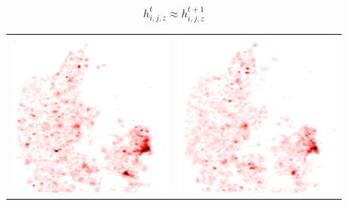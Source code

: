 \documentclass[11pt, oneside]{report}
\begin{document}
\[
h_{i,j,z}^t \approx h_{i,j,z}^{t+1}
\]

\begin{figure}
\centering
\begin{tabular}{cc}
\includegraphics[scale=0.5]{figs-tileheat/heatmap-e_1.png} & \includegraphics[scale=0.5]{figs-tileheat/heatmap-e_2.png} \\

\end{tabular}
\end{figure}
\end{document}
